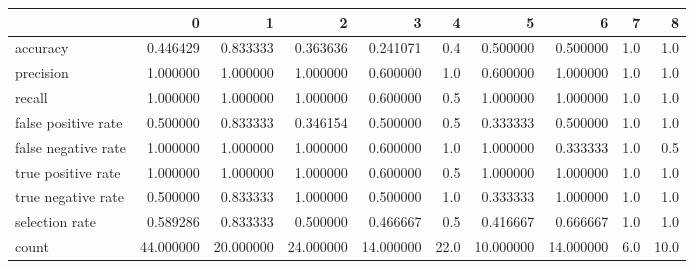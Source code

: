 \begin{tabular}{lrrrrrrrrr}
\toprule
{} &          0 &          1 &          2 &          3 &     4 &          5 &          6 &    7 &     8 \\
\midrule
accuracy            &   0.446429 &   0.833333 &   0.363636 &   0.241071 &   0.4 &   0.500000 &   0.500000 &  1.0 &   1.0 \\
precision           &   1.000000 &   1.000000 &   1.000000 &   0.600000 &   1.0 &   0.600000 &   1.000000 &  1.0 &   1.0 \\
recall              &   1.000000 &   1.000000 &   1.000000 &   0.600000 &   0.5 &   1.000000 &   1.000000 &  1.0 &   1.0 \\
false positive rate &   0.500000 &   0.833333 &   0.346154 &   0.500000 &   0.5 &   0.333333 &   0.500000 &  1.0 &   1.0 \\
false negative rate &   1.000000 &   1.000000 &   1.000000 &   0.600000 &   1.0 &   1.000000 &   0.333333 &  1.0 &   0.5 \\
true positive rate  &   1.000000 &   1.000000 &   1.000000 &   0.600000 &   0.5 &   1.000000 &   1.000000 &  1.0 &   1.0 \\
true negative rate  &   0.500000 &   0.833333 &   1.000000 &   0.500000 &   1.0 &   0.333333 &   1.000000 &  1.0 &   1.0 \\
selection rate      &   0.589286 &   0.833333 &   0.500000 &   0.466667 &   0.5 &   0.416667 &   0.666667 &  1.0 &   1.0 \\
count               &  44.000000 &  20.000000 &  24.000000 &  14.000000 &  22.0 &  10.000000 &  14.000000 &  6.0 &  10.0 \\
\bottomrule
\end{tabular}
